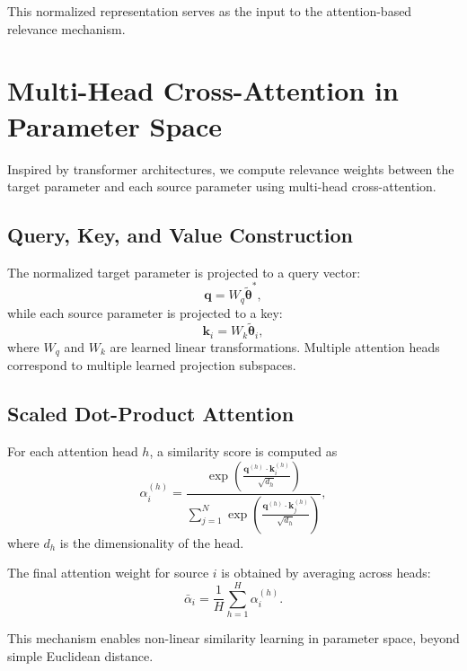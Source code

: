 \documentclass[10pt]{article}
\begin{document}
This normalized representation serves as the input to the attention-based relevance mechanism.

\section{Multi-Head Cross-Attention in Parameter Space}

Inspired by transformer architectures, we compute relevance weights between the target parameter and each source parameter using multi-head cross-attention.

\subsection{Query, Key, and Value Construction}

The normalized target parameter is projected to a query vector:
\begin{equation}
\mathbf{q} = W_q \tilde{\boldsymbol{\theta}}^*,
\end{equation}
while each source parameter is projected to a key:
\begin{equation}
\mathbf{k}_i = W_k \tilde{\boldsymbol{\theta}}_i,
\end{equation}
where $W_q$ and $W_k$ are learned linear transformations. Multiple attention heads correspond to multiple learned projection subspaces.

\subsection{Scaled Dot-Product Attention}

For each attention head $h$, a similarity score is computed as
\begin{equation}
\alpha_i^{(h)} =
\frac{\exp\left( \frac{\mathbf{q}^{(h)} \cdot \mathbf{k}_i^{(h)}}{\sqrt{d_h}} \right)}
{\sum_{j=1}^{N} \exp\left( \frac{\mathbf{q}^{(h)} \cdot \mathbf{k}_j^{(h)}}{\sqrt{d_h}} \right)},
\end{equation}
where $d_h$ is the dimensionality of the head.

The final attention weight for source $i$ is obtained by averaging across heads:
\begin{equation}
\bar{\alpha}_i = \frac{1}{H} \sum_{h=1}^{H} \alpha_i^{(h)}.
\end{equation}

This mechanism enables non-linear similarity learning in parameter space, beyond simple Euclidean distance.
\end{document}
